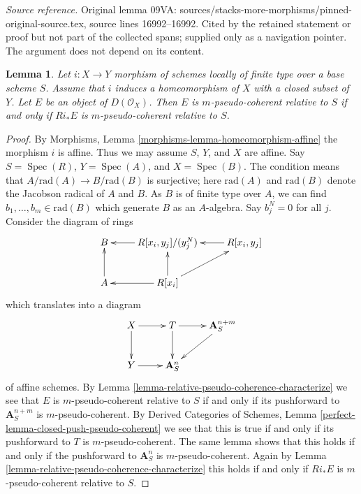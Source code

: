\documentclass[10pt,a4paper]{amsart}
\theoremstyle{plain}
\newtheorem{lemma}[subsection]{Lemma}
\theoremstyle{definition}
\theoremstyle{remark}
\numberwithin{equation}{subsection}
\def\Spec{\mathop{\mathrm{Spec}}}
\begin{document}
\noindent\textit{Source reference.} Original lemma 09VA: sources/stacks-more-morphisms/pinned-original-source.tex, source lines 16992--16992. Cited by the retained statement or proof but not part of the collected spans; supplied only as a navigation pointer. The argument does not depend on its content.\par\medskip
\begin{lemma}
\label{lemma-closed-morphism-relative-pseudo-coherence}
Let $i : X \to Y$ morphism of schemes locally of finite type over a
base scheme $S$. Assume that $i$ induces a homeomorphism of $X$ with a closed
subset of $Y$. Let $E$ be an object of $D(\mathcal{O}_X)$.
Then $E$ is $m$-pseudo-coherent relative to $S$ if and only if
$Ri_*E$ is $m$-pseudo-coherent relative to $S$.
\end{lemma}

\begin{proof}
By Morphisms, Lemma \ref{morphisms-lemma-homeomorphism-affine}
the morphism $i$ is affine. Thus we may assume $S$, $Y$, and $X$ are affine.
Say $S = \Spec(R)$, $Y = \Spec(A)$, and $X = \Spec(B)$.
The condition means that $A/\text{rad}(A) \to B/\text{rad}(B)$ is
surjective; here $\text{rad}(A)$ and $\text{rad}(B)$ denote
the Jacobson radical of $A$ and $B$.
As $B$ is of finite type over $A$, we can find
$b_1, \ldots, b_m \in \text{rad}(B)$ which generate $B$ as an
$A$-algebra. Say $b_j^N = 0$ for all $j$. Consider the diagram of
rings
$$
\xymatrix{
B & R[x_i, y_j]/(y_j^N) \ar[l] & R[x_i, y_j] \ar[l] \\
A \ar[u] & R[x_i] \ar[l] \ar[u] \ar[ru]
}
$$
which translates into a diagram
$$
\xymatrix{
X \ar[d] \ar[r] & T \ar[d] \ar[r] & \mathbf{A}^{n + m}_S \ar[ld] \\
Y \ar[r] & \mathbf{A}^n_S
}
$$
of affine schemes. By Lemma \ref{lemma-relative-pseudo-coherence-characterize}
we see that $E$ is $m$-pseudo-coherent relative to $S$ if and only if its
pushforward to $\mathbf{A}^{n + m}_S$ is $m$-pseudo-coherent. 
By Derived Categories of Schemes, Lemma
\ref{perfect-lemma-closed-push-pseudo-coherent}
we see that this is true if and only if its pushforward to $T$ is
$m$-pseudo-coherent. The same lemma shows that this holds if and only
if the pushforward to $\mathbf{A}^n_S$ is $m$-pseudo-coherent.
Again by
Lemma \ref{lemma-relative-pseudo-coherence-characterize}
this holds if and only if $Ri_*E$ is $m$-pseudo-coherent relative to $S$.
\end{proof}
\end{document}
